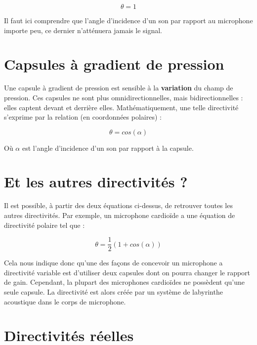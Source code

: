 \documentclass[
]{book}
\begin{document}
\[ \theta = 1 \]

Il faut ici comprendre que l'angle d'incidence d'un son par rapport au microphone importe peu, ce dernier n'atténuera jamais le signal.

\hypertarget{capsules-uxe0-gradient-de-pression}{%
\section{Capsules à gradient de pression}\label{capsules-uxe0-gradient-de-pression}}

Une capsule à gradient de pression est sensible à la \textbf{variation} du champ de pression. Ces capsules ne sont plus omnidirectionnelles, mais bidirectionnelles : elles captent devant et derrière elles. Mathématiquement, une telle directivité s'exprime par la relation (en coordonnées polaires) :

\[ \theta = cos(\alpha) \]

Où \(\alpha\) est l'angle d'incidence d'un son par rapport à la capsule.

\hypertarget{et-les-autres-directivituxe9s}{%
\section{Et les autres directivités ?}\label{et-les-autres-directivituxe9s}}

Il est possible, à partir des deux équations ci-dessus, de retrouver toutes les autres directivités. Par exemple, un microphone cardioïde a une équation de directivité polaire tel que :

\[ \theta = \frac{1}{2}(1 + cos(\alpha)) \]

Cela nous indique donc qu'une des façons de concevoir un microphone a directivité variable est d'utiliser deux capsules dont on pourra changer le rapport de gain. Cependant, la plupart des microphones cardioïdes ne possèdent qu'une seule capsule. La directivité est alors créée par un système de labyrinthe acoustique dans le corps de microphone.

\hypertarget{directivituxe9s-ruxe9elles}{%
\section{Directivités réelles}\label{directivituxe9s-ruxe9elles}}
\end{document}
